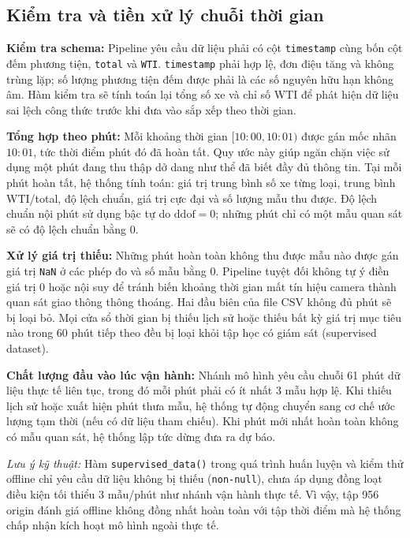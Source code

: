
    \subsection{Kiểm tra và tiền xử lý chuỗi thời gian}
    \textbf{Kiểm tra schema:} Pipeline yêu cầu dữ liệu phải có cột \texttt{timestamp} cùng bốn cột đếm phương tiện, \texttt{total} và \texttt{WTI}. \texttt{timestamp} phải hợp lệ, đơn điệu tăng và không trùng lặp; số lượng phương tiện đếm được phải là các số nguyên hữu hạn không âm. Hàm kiểm tra sẽ tính toán lại tổng số xe và chỉ số WTI để phát hiện dữ liệu sai lệch công thức trước khi đưa vào sắp xếp theo thời gian.

    \textbf{Tổng hợp theo phút:} Mỗi khoảng thời gian $[10:00, 10:01)$ được gán mốc nhãn $10:01$, tức thời điểm phút đó đã hoàn tất. Quy ước này giúp ngăn chặn việc sử dụng một phút đang thu thập dở dang như thể đã biết đầy đủ thông tin. Tại mỗi phút hoàn tất, hệ thống tính toán: giá trị trung bình số xe từng loại, trung bình WTI/total, độ lệch chuẩn, giá trị cực đại và số lượng mẫu thu được. Độ lệch chuẩn nội phút sử dụng bậc tự do $\text{ddof} = 0$; những phút chỉ có một mẫu quan sát sẽ có độ lệch chuẩn bằng 0.

    \textbf{Xử lý giá trị thiếu:} Những phút hoàn toàn không thu được mẫu nào được gán giá trị \texttt{NaN} ở các phép đo và số mẫu bằng 0. Pipeline tuyệt đối không tự ý điền giá trị 0 hoặc nội suy để tránh biến khoảng thời gian mất tín hiệu camera thành quan sát giao thông thông thoáng. Hai đầu biên của file CSV không đủ phút sẽ bị loại bỏ. Mọi cửa sổ thời gian bị thiếu lịch sử hoặc thiếu bất kỳ giá trị mục tiêu nào trong 60 phút tiếp theo đều bị loại khỏi tập học có giám sát (supervised dataset).

    \textbf{Chất lượng đầu vào lúc vận hành:} Nhánh mô hình yêu cầu chuỗi 61 phút dữ liệu thực tế liên tục, trong đó mỗi phút phải có ít nhất 3 mẫu hợp lệ. Khi thiếu lịch sử hoặc xuất hiện phút thưa mẫu, hệ thống tự động chuyển sang cơ chế ước lượng tạm thời (nếu có dữ liệu tham chiếu). Khi phút mới nhất hoàn toàn không có mẫu quan sát, hệ thống lập tức dừng đưa ra dự báo.

    \textit{Lưu ý kỹ thuật:} Hàm \texttt{supervised\_data()} trong quá trình huấn luyện và kiểm thử offline chỉ yêu cầu dữ liệu không bị thiếu (\texttt{non-null}), chưa áp dụng đồng loạt điều kiện tối thiểu 3 mẫu/phút như nhánh vận hành thực tế. Vì vậy, tập 956 origin đánh giá offline không đồng nhất hoàn toàn với tập thời điểm mà hệ thống chấp nhận kích hoạt mô hình ngoài thực tế.

